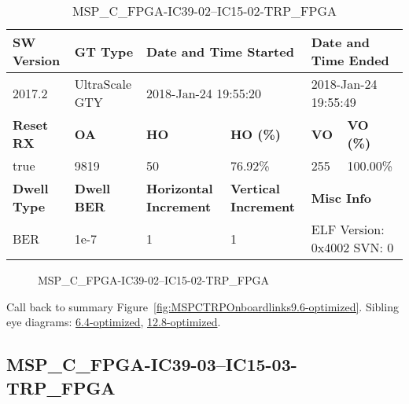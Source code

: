\begin{table}[h]
\centering
\caption{MSP\_C\_FPGA-IC39-02--IC15-02-TRP\_FPGA}
\label{tab:MSPCFPGAIC3902IC1502TRPFPGA9.6-optimized}
\begin{tabular}{@{}|l|l|l|l|l|l|@{}}
\toprule
\textbf{SW Version}                & \textbf{GT Type}   & \multicolumn{2}{l|}{\textbf{Date and Time Started}}            & \multicolumn{2}{l|}{\textbf{Date and Time Ended}}        \\ \midrule
2017.2                       & UltraScale GTY          & \multicolumn{2}{l|}{2018-Jan-24 19:55:20}                   & \multicolumn{2}{l|}{2018-Jan-24 19:55:49}               \\ \midrule
\textbf{Reset RX}                  & \textbf{OA} & \textbf{HO}   & \textbf{HO (\%)} & \textbf{VO} & \textbf{VO (\%)} \\ \midrule
true & 9819        & 50          & 76.92\%        & 255        & 100.00\%       \\ \midrule
\textbf{Dwell Type}                & \textbf{Dwell BER} & \textbf{Horizontal Increment} & \textbf{Vertical Increment}    & \multicolumn{2}{l|}{\textbf{Misc Info}}                  \\ \midrule
BER                            & 1e-7        & 1        & 1           & \multicolumn{2}{l|}{ELF Version: 0x4002 SVN: 0}                         \\ \bottomrule
\end{tabular}
\end{table}

\begin{figure}[h]
\caption{MSP\_C\_FPGA-IC39-02--IC15-02-TRP\_FPGA} \label{fig:MSPCFPGAIC3902IC1502TRPFPGA9.6-optimized}
\end{figure}

Call back to summary Figure~\ref{fig:MSPCTRPOnboardlinks9.6-optimized}.
Sibling eye diagrams: \hyperref[sec:MSPCFPGAIC3902IC1502TRPFPGA6.4-optimized]{6.4-optimized}, \hyperref[sec:MSPCFPGAIC3902IC1502TRPFPGA12.8-optimized]{12.8-optimized}.

\clearpage
\newpage


\subsection{MSP\_C\_FPGA-IC39-03--IC15-03-TRP\_FPGA}\label{sec:MSPCFPGAIC3903IC1503TRPFPGA9.6-optimized}

